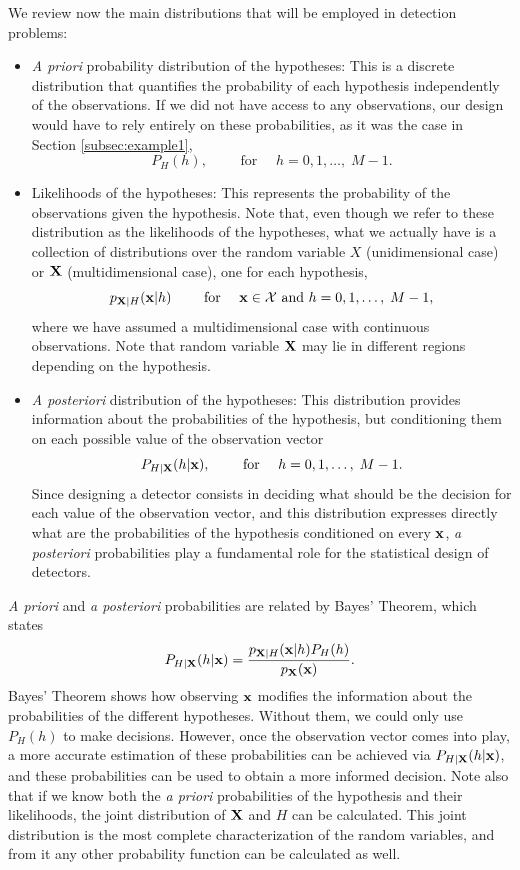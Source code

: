 We review now the main distributions that will be employed in detection problems:
\begin{itemize}
    \item {\em A priori} probability distribution of the hypotheses: This is a discrete distribution that quantifies the probability of each hypothesis independently of the observations. If we did not have access to any observations, our design would have to rely entirely on these probabilities, as it was the case in Section \ref{subsec:example1},
    $$P_H(h), \qquad \text{ for } \quad h = 0, 1, \ldots,\;M-1.$$
    
    \item Likelihoods of the hypotheses: This represents the probability of the observations given the hypothesis. Note that, even though we refer to these distribution as the likelihoods of the hypotheses, what we actually have is a collection of distributions over the random variable $X$ (unidimensional case) or ${\bf X}$ (multidimensional case), one for each hypothesis,
    $$p_{{\bf X}|H}({\bf x}|h) \qquad \text{ for } \quad {\bf x} \in {\cal X} \text{ and } h = 0, 1, \ldots,\; M-1,$$
    where we have assumed a multidimensional case with continuous observations. Note that random variable $\bf X$ may lie in different regions depending on the hypothesis.
    
    \item {\em A posteriori} distribution of the hypotheses: This distribution provides information about the probabilities of the hypothesis, but conditioning them on each possible value of the observation vector
    $$P_{H|{\bf X}}(h|{\bf x}), \qquad \text{ for } \quad h = 0, 1, \ldots,\; M-1.$$
    Since designing a detector consists in deciding what should be the decision for each value of the observation vector, and this distribution expresses directly what are the probabilities of the hypothesis conditioned on every $\bf x$, {\em a posteriori} probabilities play a fundamental role for the statistical design of detectors. 
    
\end{itemize}

{\em A priori} and {\em a posteriori} probabilities are related by Bayes' Theorem, which states
    $$P_{H|{\bf X}}(h|{\bf x}) = \frac{p_{{\bf  X} | H}({\bf x}|h) P_H(h)}{p_{\bf X}({\bf x})}.$$
Bayes' Theorem shows how observing $\bf x$ modifies the information about the probabilities of the different hypotheses. Without them, we could only use $P_H(h)$ to make decisions. However, once the observation vector comes into play, a more accurate estimation of these probabilities can be achieved via $P_{H|{\bf X}}(h|{\bf x})$, and these probabilities can be used to obtain a more informed decision. Note also that if we know both the {\em a priori} probabilities of the hypothesis and their likelihoods, the joint distribution of $\bf X$ and $H$ can be calculated. This joint distribution is the most complete characterization of the random variables, and from it any other probability function can be calculated as well.

